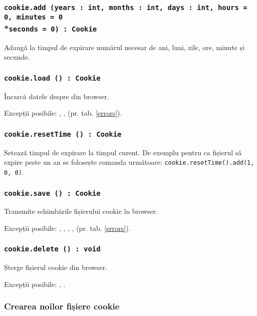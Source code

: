 \subsubsection{\texttt{cookie.add (years : int, months : int, days : int, hours = 0, minutes = 0}\\*\noindent\texttt{seconds = 0) : Cookie}}

Adaugă la timpul de expirare numărul necesar de ani, luni, zile, ore, minute și secunde.

\subsubsection{\texttt{cookie.load () : Cookie}}

Încarcă datele despre \cookie{} din browser.

Excepții posibile: , ,  (pr. tab. \ref{errors}).

\subsubsection{\texttt{cookie.resetTime () : Cookie}}

Setează timpul de expirare la timpul curent. De exemplu pentru ca fișierul să expire peste un an se folosește comanda următoare: \texttt{cookie.resetTime().add(1, 0, 0)}.

\subsubsection{\texttt{cookie.save () : Cookie}}

Transmite schimbările fișierului cookie în browser.

Excepții posibile: , , , ,  (pr. tab. \ref{errors}).

\subsubsection{\texttt{cookie.delete () : void}}

Șterge fișierul cookie din browser.

Excepții posibile: , .

\subsubsection{Crearea noilor fișiere cookie}

